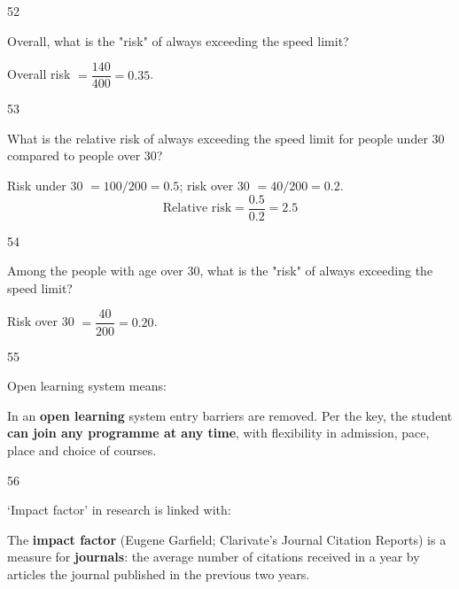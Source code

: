 \begin{question}{52}
{Overall, what is the "risk" of always exceeding the speed limit?\par}
\begin{explain}
Overall risk $=\dfrac{140}{400}=\mathbf{0.35}$.
\end{explain}
\end{question}

\begin{question}{53}
{What is the relative risk of always exceeding the speed limit for people under 30 compared to people over 30?\par}
\begin{explain}
Risk under 30 $=100/200=0.5$; risk over 30 $=40/200=0.2$.
\[\text{Relative risk}=\frac{0.5}{0.2}=\mathbf{2.5}\]
\end{explain}
\end{question}

\begin{question}{54}
{Among the people with age over 30, what is the "risk" of always exceeding the speed limit?\par}
\begin{explain}
Risk over 30 $=\dfrac{40}{200}=\mathbf{0.20}$.
\end{explain}
\end{question}

\begin{question}{55}
{Open learning system means:\par}
\begin{explain}
In an \textbf{open learning} system entry barriers are removed. Per the key, the student \textbf{can join any programme at any time}, with flexibility in admission, pace, place and choice of courses.
\end{explain}
\end{question}

\begin{question}{56}
{`Impact factor' in research is linked with:\par}
\begin{explain}
The \textbf{impact factor} (Eugene Garfield; Clarivate's Journal Citation Reports) is a measure for \textbf{journals}: the average number of citations received in a year by articles the journal published in the previous two years.
\end{explain}
\end{question}

